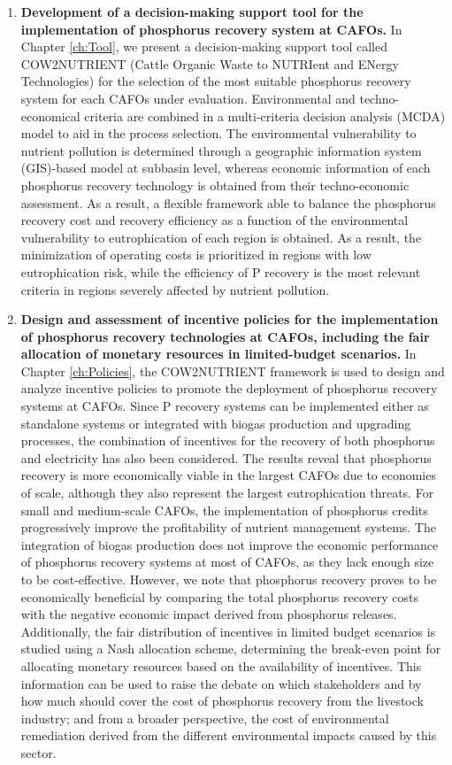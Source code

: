 \begin{enumerate}[font=\bfseries]
	\item \textbf{Development of a decision-making support tool for the implementation of phosphorus recovery system at CAFOs.} In Chapter \ref{ch:Tool}, we present a decision-making support tool called  COW2NUTRIENT (Cattle Organic Waste to NUTRIent and ENergy Technologies) for the
	selection of the most suitable phosphorus recovery system for each CAFOs under evaluation. Environmental and techno-economical criteria are combined in a multi-criteria decision analysis (MCDA) model to aid in the process selection. The environmental vulnerability to nutrient pollution is determined through a geographic information system (GIS)-based model at subbasin level, whereas economic information of each phosphorus recovery technology is obtained from their techno-economic assessment. As a result, a flexible framework able to balance the phosphorus recovery cost and recovery efficiency as a function of the environmental vulnerability to eutrophication of each region is obtained. As a result, the minimization of operating costs is
	prioritized in regions with low eutrophication risk, while the efficiency of P recovery is the most relevant criteria in regions severely affected by nutrient pollution.
	
	\item \textbf{Design and assessment of incentive policies for the implementation of phosphorus recovery technologies at CAFOs, including the fair allocation of monetary resources in limited-budget scenarios.} In Chapter \ref{ch:Policies}, the COW2NUTRIENT framework is used to design and analyze incentive policies to promote the deployment of phosphorus recovery systems at CAFOs. Since P recovery systems can be implemented either as standalone systems or integrated with biogas production and upgrading processes, the combination of incentives for the recovery	of both phosphorus and electricity has also been considered. The results reveal that phosphorus recovery is more economically viable in the largest CAFOs due to economies of scale, although they also represent the largest eutrophication threats. For small and medium-scale CAFOs, the implementation of phosphorus credits progressively improve the	profitability of nutrient management systems. The integration of biogas production does not improve the economic performance of phosphorus recovery systems at most of CAFOs, as they lack enough size to be cost-effective. However, we note that phosphorus recovery proves to be economically beneficial by comparing the total phosphorus recovery costs with the negative economic impact derived from phosphorus releases. Additionally, the fair distribution of incentives in limited budget scenarios is studied using a Nash allocation scheme, determining the break-even point for allocating monetary resources based on the availability of incentives. This information can be used to raise the debate on which stakeholders and by how much should cover the cost of phosphorus recovery from the livestock industry; and from a broader perspective, the cost of environmental remediation derived from the
	different environmental impacts caused by this sector.
	

\end{enumerate}
